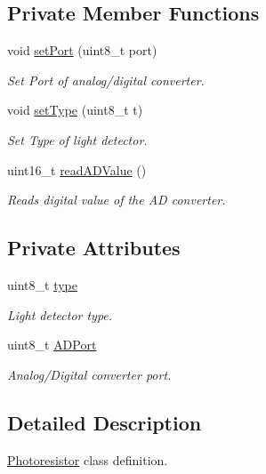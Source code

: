 \subsection*{Private Member Functions}
\begin{DoxyCompactItemize}
\item 
void \hyperlink{classSensors_1_1Photoresistor_a46314a8e495c2ad308fe89935b1c2574}{set\+Port} (uint8\+\_\+t port)
\begin{DoxyCompactList}\small\item\em Set Port of analog/digital converter. \end{DoxyCompactList}\item 
void \hyperlink{classSensors_1_1Photoresistor_a03306f2c1b5a7d65b46178dcc25c1c9a}{set\+Type} (uint8\+\_\+t t)
\begin{DoxyCompactList}\small\item\em Set Type of light detector. \end{DoxyCompactList}\item 
uint16\+\_\+t \hyperlink{classSensors_1_1Photoresistor_aaee5f77d43f8a7d3175a9bf3e635041d}{read\+A\+D\+Value} ()
\begin{DoxyCompactList}\small\item\em Reads digital value of the AD converter. \end{DoxyCompactList}\end{DoxyCompactItemize}
\subsection*{Private Attributes}
\begin{DoxyCompactItemize}
\item 
uint8\+\_\+t \hyperlink{classSensors_1_1Photoresistor_abdd598255c0051cbc8db8a457cd29dc8}{type}
\begin{DoxyCompactList}\small\item\em Light detector type. \end{DoxyCompactList}\item 
uint8\+\_\+t \hyperlink{classSensors_1_1Photoresistor_a43797415ff86174f92b44e69046e3de7}{A\+D\+Port}
\begin{DoxyCompactList}\small\item\em Analog/\+Digital converter port. \end{DoxyCompactList}\end{DoxyCompactItemize}


\subsection{Detailed Description}
\hyperlink{classSensors_1_1Photoresistor}{Photoresistor} class definition. 

